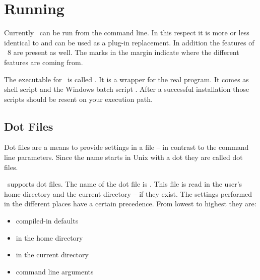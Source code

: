 

\section{Running \ExBib}

Currently \ExBib\ can be run from the command line. In this respect it
is more or less identical to \BibTeX{} and can be
used as a plug-in replacement. In addition the features of
\BibTeX~8 are present as well. The marks in
the margin indicate where the different features are coming from.

The executable for \ExBib\ is called . It is a wrapper
for the real program. It comes as shell script  and the
Windows batch script . After a successful installation
those scripts should be resent on your execution path.


\subsection{Dot Files}%
\label{sec:dot.files}%

Dot files are a means to provide settings in a file -- in contrast to
the command line parameters. Since the name starts in Unix
with a dot they are called dot files.

\ExBib\ supports dot files. The name of the dot file is .
This file is read in the user's home directory and the current
directory -- if they exist. The settings performed in the different
places have a certain precedence. From lowest to highest they are:

\begin{itemize}
\item compiled-in defaults
\item {} in the home directory
\item {} in the current directory
\item command line arguments
\end{itemize}

